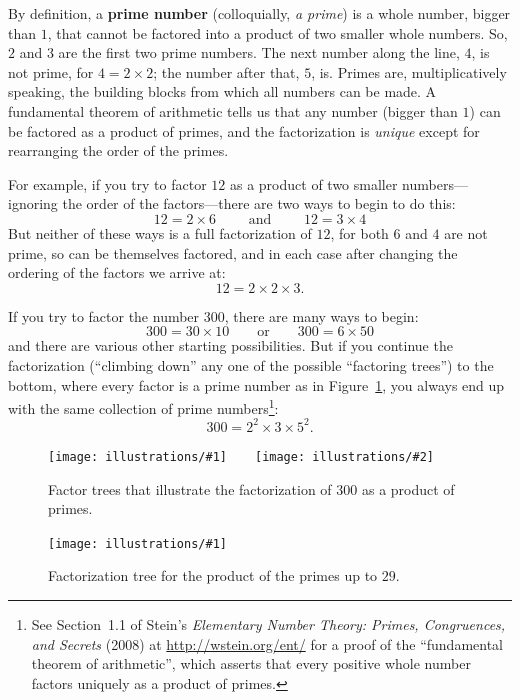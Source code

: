 \documentclass[openany]{book}
\newcommand{\ill}[3]{%
   \begin{figure}[H]%
   \vspace{-2ex}
   \centering%
   \texttt{[image: illustrations/\#1]}%
   \caption{#3}%
   \vspace{-2ex}
    \end{figure}}
\newcommand{\illtwo}[4]{%
   \begin{figure}[H]\centering%
   \texttt{[image: illustrations/\#1]}$\qquad$\texttt{[image: illustrations/\#2]}%
   \caption{#4}%
    \end{figure}}
\theoremstyle{plain}
\theoremstyle{definition}
\begin{document}
By definition, a {\bf prime number}
(colloquially, {\em a prime}) is a whole number, bigger than $1$, that
cannot be factored into a product of two smaller whole numbers. So,
$2$ and $3$ are the first two prime numbers. The next number along the
line, $4$, is not prime, for $4= 2\times 2$; the number after that,
$5$, is. Primes are, multiplicatively speaking, the building blocks
from which all numbers can be made. A fundamental theorem of
arithmetic tells us that any number (bigger than $1$) can be factored
as a product of primes, and the factorization is {\em unique} except
for rearranging the order of the primes.



For example, if you try to factor $12$ as a product of
two smaller numbers---ignoring the order of the factors---there are two
ways to begin to do this:
$$
  12 = 2 \times 6 \qquad\text{ and }\qquad   12 = 3 \times 4
$$
But neither of these ways is a full factorization of $12$, for both
$6$ and $4$ are not prime, so can be themselves factored, and in each
case after changing the ordering of the factors we arrive at:
$$
   12= 2 \times 2 \times 3.
$$

If you try to factor the number $300$, there are many
ways to begin:
$$
  300= 30\times 10\qquad\text{or}\qquad 300 = 6 \times 50
$$
and there are various other starting possibilities. But if you
continue the factorization (``climbing down'' any one of the possible
``factoring trees'') to the bottom, where every factor is a prime
number as in Figure~\ref{fig:factor300}, you always end up with the
same collection of prime numbers\footnote{See Section~1.1 of
Stein's {\em Elementary Number Theory: Primes, Congruences, and Secrets} (2008) at \url{http://wstein.org/ent/}
for a proof of the ``fundamental theorem of arithmetic'',
which asserts that every positive
whole number factors uniquely as a product of primes.}:
                 $$300 = 2^2\times 3\times 5^2.$$

\illtwo{factor_tree_300_a}{factor_tree_300_b}{.47}
{Factor trees that illustrate the factorization of 300 as a product of primes.\label{fig:factor300}}

\ill{factor_tree_big}{1}{Factorization tree for the product of the primes up to $29$.\label{factor.tree.big}}%
\end{document}

